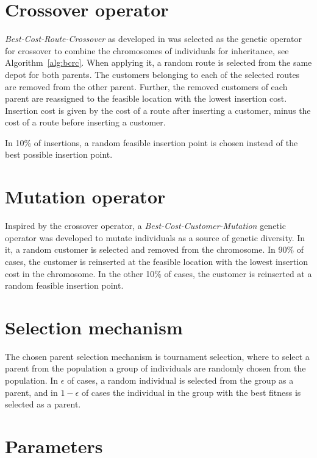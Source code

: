 \documentclass[paper=a4, fontsize=9pt]{scrartcl}
\begin{document}
\begin{multicols}{2}
\section*{Crossover operator}

\textit{Best-Cost-Route-Crossover} as developed in \cite{ombuki2006multi} was selected as the genetic operator for crossover to combine the chromosomes of individuals for inheritance, see Algorithm~\ref{alg:bcrc}. When applying it, a random route is selected from the same depot for both parents. The customers belonging to each of the selected routes are removed from the other parent. Further, the removed customers of each parent are reassigned to the feasible location with the lowest insertion cost. Insertion cost is given by the cost of a route after inserting a customer, minus the cost of a route before inserting a customer.

In 10\% of insertions, a random feasible insertion point is chosen instead of the best possible insertion point.

\section*{Mutation operator}

Inspired by the crossover operator, a \textit{Best-Cost-Customer-Mutation} genetic operator was developed to mutate individuals as a source of genetic diversity. In it, a random customer is selected and removed from the chromosome. In 90\% of cases, the customer is reinserted at the feasible location with the lowest insertion cost in the chromosome. In the other 10\% of cases, the customer is reinserted at a random feasible insertion point.

\section*{Selection mechanism}

The chosen parent selection mechanism is tournament selection, where to select a parent from the population a group of individuals are randomly chosen from the population. In $\epsilon$ of cases, a random individual is selected from the group as a parent, and in $1 - \epsilon$ of cases the individual in the group with the best fitness is selected as a parent.

\section*{Parameters}


\end{multicols}
\end{document}
